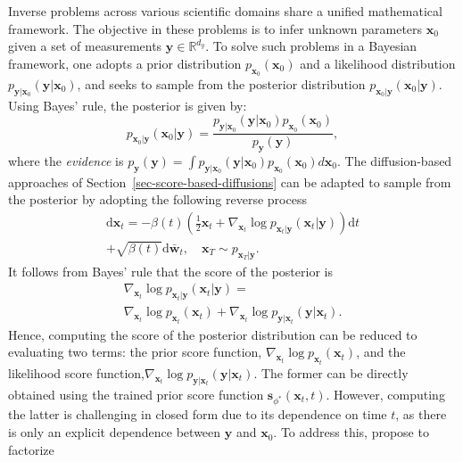Inverse problems across various scientific domains share a unified mathematical framework. The objective in these problems is to infer unknown parameters $\mathbf{x}_{0}$ given a set of measurements 
$\mathbf{y} \in \mathbb{R}^{d_{y}}$.
To solve such problems in a Bayesian framework, one adopts a prior distribution $p_{\mathbf{x}_0}(\mathbf{x}_0)$ and a likelihood distribution  $p_{\mathbf{y}|\mathbf{x}_0}(\mathbf{y}|\mathbf{x}_0)$, and seeks to sample from the posterior distribution $p_{\mathbf{x}_0|\mathbf{y}}(\mathbf{x}_0|\mathbf{y})$. 
Using Bayes’ rule, the posterior is given by:
\begin{equation*}
p_{\mathbf{x}_0|\mathbf{y}}(\mathbf{x}_0|\mathbf{y}) = \frac{ p_{\mathbf{y}|\mathbf{x}_0}(\mathbf{y}|\mathbf{x}_0)p_{\mathbf{x}_0}(\mathbf{x}_0)}{p_{\mathbf{y}}(\mathbf{y})},
\end{equation*}
where the \textit{evidence} is $p_{\mathbf{y}}(\mathbf{y}) = \int p_{\mathbf{y}|\mathbf{x}_0}(\mathbf{y}|\mathbf{x}_0)p_{\mathbf{x}_0}(\mathbf{x}_0) d\mathbf{x}_0$. The diffusion-based approaches of Section~\ref{sec-score-based-diffusions} can be adapted to sample from the posterior by adopting the following reverse process
\begin{multline}
\label{eq:reverse_SDE_posterior}
\mathrm{d}\mathbf{x}_t = - \beta(t) \left(\frac{1}{2}\mathbf{x}_t+ \nabla_{\mathbf{x}_t}\log p_{\mathbf{x}_{t}\vert \mathbf{y}}(\mathbf{x}_t|\mathbf{y})  
\right)  \mathrm{d}t \\ + \sqrt{\beta(t)} \mathrm{d}\bar{\mathbf{w}}_t, \quad \mathbf{x}_T \sim p_{\mathbf{x}_T|\mathbf{y}}. 
\end{multline}
It follows from Bayes' rule that the score of the posterior is 
\begin{multline} 
\label{eq:score_posterior}
    \nabla_{\mathbf{x}_t }\log p_{\mathbf{x}_t | \mathbf{y}}(\mathbf{x}_t | \mathbf{y}) = \\ \nabla_{\mathbf{x}_t } \log p_{\mathbf{x}_t}(\mathbf{x}_t) + \nabla_{\mathbf{x}_t } \log p_{\mathbf{y}|\mathbf{x}_t}(\mathbf{y}|\mathbf{x}_t).
\end{multline}
Hence, computing the score of the posterior distribution can be reduced to evaluating two terms: the prior score function, $\nabla_{\mathbf{x}_t }\log p_{\mathbf{x}_t}(\mathbf{x}_t)$, and the likelihood score function,$\nabla_{\mathbf{x}_t} \log p_{\mathbf{y}|\mathbf{x}_t}(\mathbf{y}|\mathbf{x}_t)$. The former can be directly obtained using the trained prior score function $\mathbf{s}_{\phi^*}(\mathbf{x}_t, t)$. However, computing the latter is challenging in closed form due to its dependence on time $t$, as there is only an explicit dependence between $\mathbf{y}$ and $\mathbf{x}_0$. To address this, \citet{chung2023} propose to factorize
